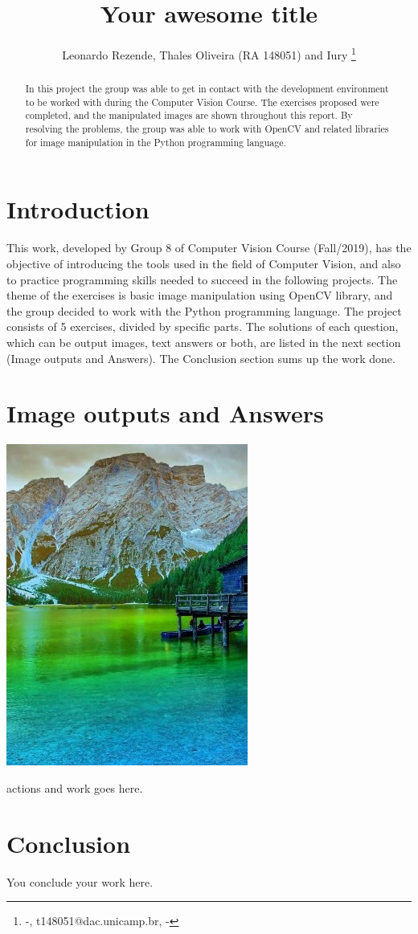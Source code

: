 \documentclass[]{IEEEtran}
\begin{document}
  \title{Your awesome title}
  \author{Leonardo Rezende, Thales Oliveira (RA 148051) and Iury 
    \thanks{-, t148051@dac.unicamp.br, -}
  }
  \maketitle
  
  \begin{abstract}
    In this project the group was able to get in contact with the development environment to be worked with during the Computer Vision Course. The exercises proposed were completed, and the manipulated images are shown throughout this report. By resolving the problems, the group was able to work with OpenCV and related libraries for image manipulation in the Python programming language.
  \end{abstract}
  
  \section{Introduction}
  
  This work, developed by Group 8 of Computer Vision Course (Fall/2019), has the objective of introducing the tools used in the field of Computer Vision, and also to practice programming skills needed to succeed in the following projects. The theme of the exercises is basic image manipulation using OpenCV library, and the group decided to work with the Python programming language. The project consists of 5 exercises, divided by specific parts. The solutions of each question, which can be output images, text answers or both, are listed in the next section (Image outputs and Answers). The Conclusion section sums up the work done. 


  \section{Image outputs and Answers}
  
  \includegraphics{../output/o-2-a-0.jpg}

  actions and work goes here.
  
  \section{Conclusion}
  
  You conclude your work here.
  
\end{document}
